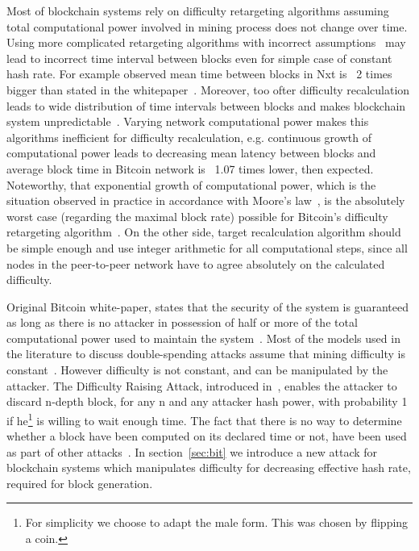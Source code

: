 \documentclass[number,preprint,review]{elsarticle}
\begin{document}
Most of blockchain systems rely on difficulty retargeting algorithms assuming total computational power involved in mining process does not change over time.
Using more complicated retargeting algorithms with incorrect assumptions~\cite{andruiman2014} may lead to incorrect time interval between blocks even for simple case of constant hash rate. For example observed mean time between blocks in Nxt is ~2 times bigger than stated in the whitepaper~\cite{nxt}. Moreover, too ofter difficulty recalculation leads to wide distribution of time intervals between blocks and makes blockchain system unpredictable~\cite{andruiman2014}.
Varying network computational power makes this algorithms inefficient for difficulty recalculation, e.g. continuous growth of computational power leads to decreasing mean latency between blocks and average block time in Bitcoin network is ~1.07 times lower, then expected.
Noteworthy, that exponential growth of computational power, which is the situation observed in practice in accordance with Moore’s law~\cite{moore2006cramming}, is the absolutely worst case (regarding the maximal block rate) possible for Bitcoin’s difficulty retargeting algorithm~\cite{kraft2015difficulty}.
On the other side, target recalculation algorithm should be simple enough and use integer arithmetic for all computational steps, since all nodes in the peer-to-peer network have to agree absolutely on the calculated difficulty.

Original Bitcoin white-paper, states that the security of the system is guaranteed as long as there is no attacker in possession of half or more of the total computational power used to maintain the system~\cite{Nakamoto2008}.
Most of the models used in the literature to discuss double-spending attacks assume that mining difficulty is constant~\cite{??}.
However difficulty is not constant, and can be manipulated by the attacker.
The Difficulty Raising Attack, introduced in~\cite{bahack2013theoretical}, enables the attacker to discard n-depth block, for any n and any attacker hash power, with probability 1 if he\footnote{For simplicity we choose to adapt the male form. This was chosen by flipping a coin.} is willing to wait enough time.
The fact that there is no way to determine whether a block have been computed on its declared time or not, have been used as part of other attacks~\cite{timejacking2011, artforz2011}.
In section~\ref{sec:bit} we introduce a new attack for blockchain systems which manipulates difficulty for decreasing effective hash rate, required for block generation.
\end{document}
